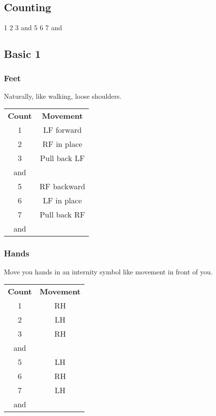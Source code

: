 \subsection{Counting}
1 2 3 and 5 6 7 and

\subsection{Basic 1}
\subsubsection{Feet}
Naturally, like walking, loose shoulders.

\begin{table}[H]
\centering
\begin{tabular}{cc}
  \toprule
  \textbf{Count} & \textbf{Movement}\\
  \cmidrule(lr){1-1}\cmidrule(lr){2-2}
  1 & LF forward\\
 2 & RF in place\\
 3 & Pull back LF\\
 and &\\
 5 & RF backward\\
 6 & LF in place\\
 7 & Pull back RF\\
 and &\\
  \bottomrule
\end{tabular}
\label{basic1_feet}
\end{table}

\subsubsection{Hands}
Move you hands in an internity symbol like movement in front of you.

\begin{table}[H]
\centering
\begin{tabular}{cc}
  \toprule
  \textbf{Count} & \textbf{Movement}\\
  \cmidrule(lr){1-1}\cmidrule(lr){2-2}
  1 & RH\\
  2 & LH\\
  3 & RH\\
  and & \\
  5 & LH\\
  6 & RH\\
  7 & LH\\
  and & \\
  \bottomrule
\end{tabular}
\label{basic1_hands}
\end{table}
